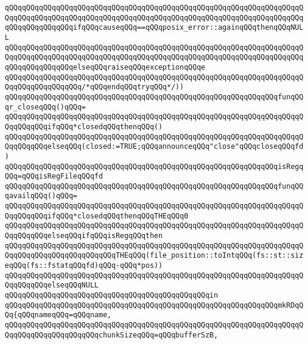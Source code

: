 \verb|qQQqqQQqqQQqqQQqqQQqqQQqqQQqqQQqqQQqqQQqqQQqqQQqqQQqqQQqqQQqqQQqqQQqqQQqqQQqqQQqqQQqqQQqqQQqqQQqqQQqqQQqqQQqqQQqqQQqqQQqqQQqqQQqqQQqqQQqqQQqqQQqqQQqqQQqqQQqifqQQqcauseqQQq==qQQqposix_error::againqQQqthenqQQqNULL|\newline
\verb|qQQqqQQqqQQqqQQqqQQqqQQqqQQqqQQqqQQqqQQqqQQqqQQqqQQqqQQqqQQqqQQqqQQqqQQqqQQqqQQqqQQqqQQqqQQqqQQqqQQqqQQqqQQqqQQqqQQqqQQqqQQqqQQqqQQqqQQqqQQqqQQqqQQqqQQqqQQqelseqQQqraiseqQQqexceptionqQQqe|\newline
\verb|qQQqqQQqqQQqqQQqqQQqqQQqqQQqqQQqqQQqqQQqqQQqqQQqqQQqqQQqqQQqqQQqqQQqqQQqqQQqqQQqqQQqqQQq/*qQQqendqQQqtryqQQq*/))|\newline
\verb|qQQqqQQqqQQqqQQqqQQqqQQqqQQqqQQqqQQqqQQqqQQqqQQqqQQqqQQqqQQqqQQqfunqQQqr_closeqQQq()qQQq=|\newline
\verb|qQQqqQQqqQQqqQQqqQQqqQQqqQQqqQQqqQQqqQQqqQQqqQQqqQQqqQQqqQQqqQQqqQQqqQQqqQQqqQQqifqQQq*closedqQQqthenqQQq()|\newline
\verb|qQQqqQQqqQQqqQQqqQQqqQQqqQQqqQQqqQQqqQQqqQQqqQQqqQQqqQQqqQQqqQQqqQQqqQQqqQQqqQQqelseqQQq(closed:=TRUE;qQQqannounceqQQq"close"qQQqcloseqQQqfd)|\newline
\verb|qQQqqQQqqQQqqQQqqQQqqQQqqQQqqQQqqQQqqQQqqQQqqQQqqQQqqQQqqQQqqQQqisRegqQQq=qQQqisRegFileqQQqfd|\newline
\verb|qQQqqQQqqQQqqQQqqQQqqQQqqQQqqQQqqQQqqQQqqQQqqQQqqQQqqQQqqQQqqQQqfunqQQqavailqQQq()qQQq=|\newline
\verb|qQQqqQQqqQQqqQQqqQQqqQQqqQQqqQQqqQQqqQQqqQQqqQQqqQQqqQQqqQQqqQQqqQQqqQQqqQQqqQQqifqQQq*closedqQQqthenqQQqTHEqQQq0|\newline
\verb|qQQqqQQqqQQqqQQqqQQqqQQqqQQqqQQqqQQqqQQqqQQqqQQqqQQqqQQqqQQqqQQqqQQqqQQqqQQqqQQqelseqQQqifqQQqisRegqQQqthen|\newline
\verb|qQQqqQQqqQQqqQQqqQQqqQQqqQQqqQQqqQQqqQQqqQQqqQQqqQQqqQQqqQQqqQQqqQQqqQQqqQQqqQQqqQQqqQQqqQQqqQQqTHEqQQq(file_position::toIntqQQq(fs::st::sizeqQQq(fs::fstatqQQqfd)qQQq-qQQq*pos))|\newline
\verb|qQQqqQQqqQQqqQQqqQQqqQQqqQQqqQQqqQQqqQQqqQQqqQQqqQQqqQQqqQQqqQQqqQQqqQQqqQQqqQQqelseqQQqNULL|\newline
\verb|qQQqqQQqqQQqqQQqqQQqqQQqqQQqqQQqqQQqqQQqqQQqqQQqin|\newline
\verb|qQQqqQQqqQQqqQQqqQQqqQQqqQQqqQQqqQQqqQQqqQQqqQQqqQQqqQQqqQQqqQQqmkRDqQQq{qQQqnameqQQq=qQQqname,|\newline
\verb|qQQqqQQqqQQqqQQqqQQqqQQqqQQqqQQqqQQqqQQqqQQqqQQqqQQqqQQqqQQqqQQqqQQqqQQqqQQqqQQqqQQqqQQqqQQqchunkSizeqQQq=qQQqbufferSzB,|\newline
